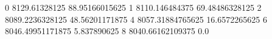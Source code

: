 0 8129.61328125 88.95166015625
1 8110.146484375 69.48486328125
2 8089.2236328125 48.56201171875
4 8057.31884765625 16.6572265625
6 8046.49951171875 5.837890625
8 8040.66162109375 0.0

